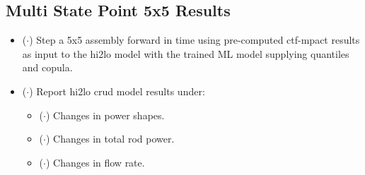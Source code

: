 \subsection{Multi State Point 5x5 Results}

\begin{itemize}
    \item ($\cdot$) Step a 5x5 assembly forward in time using pre-computed ctf-mpact results as input to the hi2lo model with the trained ML model supplying quantiles and copula.
    \item ($\cdot$) Report hi2lo crud model results under:
    \begin{itemize}
        \item ($\cdot$) Changes in power shapes.
        \item ($\cdot$) Changes in total rod power.
        \item ($\cdot$) Changes in flow rate.
    \end{itemize}

\end{itemize}
